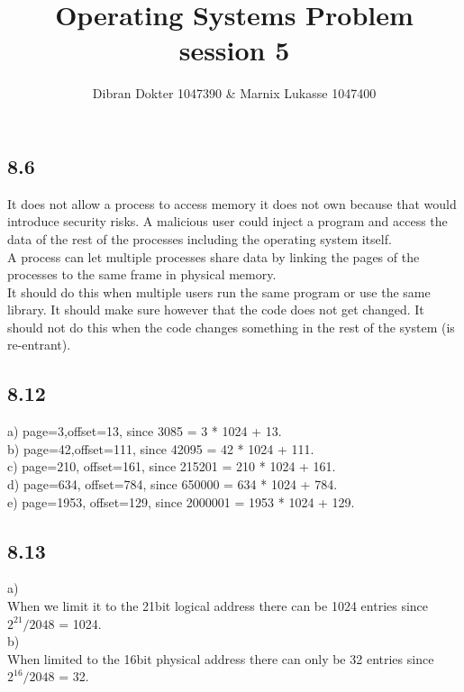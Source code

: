 \documentclass[]{article}
\title{Operating Systems Problem session 5}
\author{Dibran Dokter 1047390 \& Marnix Lukasse 1047400}
\begin{document}
\maketitle

\subsection*{8.6}

It does not allow a process to access memory it does not own because that would introduce security risks. A malicious user could inject a program and access the data of the rest of the processes including the operating system itself.\\

A process can let multiple processes share data by linking the pages of the processes to the same frame in physical memory.\\

It should do this when multiple users run the same program or use the same library. It should make sure however that the code does not get changed. It should not do this when the code changes something in the rest of the system (is re-entrant).\\

\subsection*{8.12}

a) page=3,offset=13, since 3085 = 3 * 1024 + 13.\\
b) page=42,offset=111, since 42095 = 42 * 1024 + 111.\\
c) page=210, offset=161, since 215201 = 210 * 1024 + 161.\\
d) page=634, offset=784, since 650000 = 634 * 1024 + 784.\\
e) page=1953, offset=129, since 2000001 = 1953 * 1024 + 129.\\

\subsection*{8.13}

a)\\
When we limit it to the 21bit logical address there can be 1024 entries since $2^{21} / 2048$ = 1024.\\
b)\\
When limited to the 16bit physical address there can only be 32 entries since $2^{16} / 2048$ = 32.\\
\end{document}
